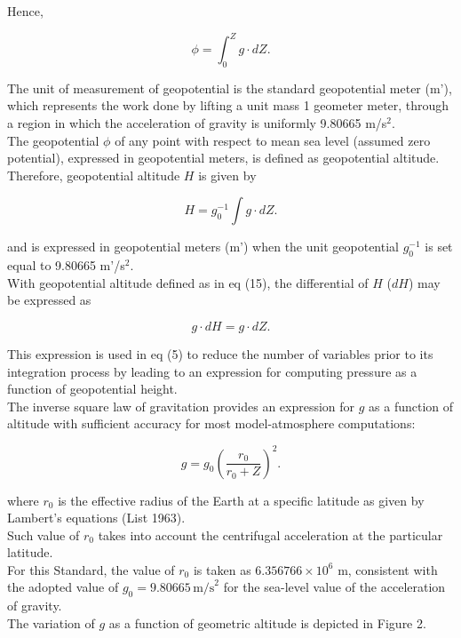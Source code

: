 \documentclass{article}
\begin{document}
Hence,

\begin{equation}
 \phi = \int_{0}^{Z} g \cdot dZ . \tag{14}
\end{equation}

The unit of measurement of geopotential is the standard geopotential meter (m'), which represents the work done by lifting a unit mass 1 geometer meter, through a region in which the acceleration of gravity is uniformly 9.80665 m/s$^2$. \\

The geopotential $\phi$ of any point with respect to mean sea level (assumed zero potential), expressed in geopotential meters, is defined as geopotential altitude. \\
Therefore, geopotential altitude $H$ is given by

\begin{equation}
 H = g_0^{-1} \int g \cdot dZ. \tag{15}
\end{equation}

and is expressed in geopotential meters (m') when the unit geopotential $g_0^{-1}$ is set equal to 9.80665 m'/s$^2$. \\

With geopotential altitude defined as in eq (15), the differential of $H$ ($dH$) may be expressed as

\begin{equation}
 g\cdot dH = g\cdot dZ. \tag{16}
\end{equation}

This expression is used in eq (5) to reduce the number of variables prior to its integration process by leading to an expression for computing pressure as a function of geopotential height. \\

The inverse square law of gravitation provides an expression for $g$ as a function of altitude with sufficient accuracy for most model-atmosphere computations:

\begin{equation}
 g = g_0 \left( \frac{r_0}{r_0 + Z} \right)^2. \tag{17}
\end{equation}

where $r_0$ is the effective radius of the Earth at a specific latitude as given by Lambert's equations (List 1963). \\
Such value of $r_0$ takes into account the centrifugal acceleration at the particular latitude. \\
For this Standard, the value of $r_0$ is taken as $6.356766 \times 10^6$ m, consistent with the adopted value of $g_0 = 9.80665 \, \text{m/s}^2$ for the sea-level value of the acceleration of gravity. \\
The variation of $g$ as a function of geometric altitude is depicted in Figure 2.
\end{document}
